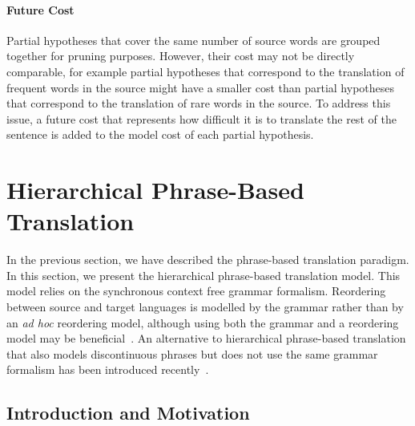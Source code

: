 \paragraph{Future Cost}
\label{sec:phraseBasedFutureCost}

Partial hypotheses that cover the same number of source
words are grouped together for pruning purposes. However,
their cost may not be directly comparable, for example
partial hypotheses that correspond to the translation of frequent
words in the source might have a smaller cost than partial hypotheses
that correspond to the translation of rare words in the source.
To address this issue, a future cost that represents how difficult it is
to translate the rest of the sentence is added to the model cost of each
partial hypothesis.

\section{Hierarchical Phrase-Based Translation}
\label{sec:hierarchicalPhraseBasedTranslation}


In the previous section, we have described the
phrase-based translation paradigm.
In this section, we present the
hierarchical phrase-based translation
model. This model relies on the synchronous
context free grammar formalism. Reordering
between source and target languages is modelled
by the grammar rather than by an \emph{ad hoc}
reordering model, although using both the grammar
and a reordering model may be
beneficial~\citep{huck-EtAl:2013:WMT}.
An alternative to hierarchical phrase-based
translation that also models discontinuous
phrases but does not use the same grammar
formalism has been introduced
recently~\citep{galley-manning:2010:NAACLHLT}.

\subsection{Introduction and Motivation}
\label{sec:hierintro}

